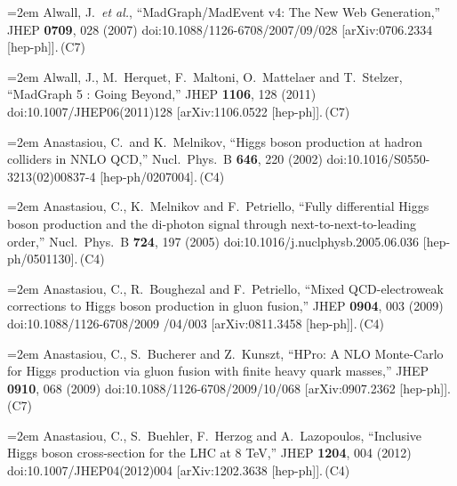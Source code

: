 \documentclass[letter,12pt]{article}
\def\xbibitem#1#2#3{\noindent\hangindent=2em #2\,(#3)}
\begin{document}
\xbibitem{Alwall:2007st}{Alwall, J.\ {\it et al.},
  ``MadGraph/MadEvent v4: The New Web Generation,''
  JHEP {\bf 0709}, 028 (2007)
  doi:10.1088/1126-6708/2007/09/028
  [arXiv:0706.2334 [hep-ph]].}{C7}
  
\xbibitem{Alwall:2011uj}{Alwall, J., M.~Herquet, F.~Maltoni, O.~Mattelaer and T.~Stelzer,
  ``MadGraph 5 : Going Beyond,''
  JHEP {\bf 1106}, 128 (2011)
  doi:10.1007/JHEP06(2011)128
  [arXiv:1106.0522 [hep-ph]].}{C7} 
  
\xbibitem{Anastasiou:2002yz}{Anastasiou, C.\ and K.~Melnikov,
  ``Higgs boson production at hadron colliders in NNLO QCD,''
  Nucl.\ Phys.\ B {\bf 646}, 220 (2002)
  doi:10.1016/S0550-3213(02)00837-4
  [hep-ph/0207004].}{C4}

\xbibitem{Anastasiou:2005qj}{Anastasiou, C., K.~Melnikov and F.~Petriello,
  ``Fully differential Higgs boson production and the di-photon signal through next-to-next-to-leading order,''
  Nucl.\ Phys.\ B {\bf 724}, 197 (2005)
  doi:10.1016/j.nuclphysb.2005.06.036
  [hep-ph/0501130].}{C4}
  
\xbibitem{Anastasiou:2008tj} {Anastasiou, C., R.~Boughezal and F.~Petriello,
  ``Mixed QCD-electroweak corrections to Higgs boson production in gluon fusion,''
  JHEP {\bf 0904}, 003 (2009)
  doi:10.1088/1126-6708/2009 /04/003
  [arXiv:0811.3458 [hep-ph]].}{C4}

\xbibitem{Anastasiou:2009kn}{Anastasiou, C., S.~Bucherer and Z.~Kunszt,
  ``HPro: A NLO Monte-Carlo for Higgs production via gluon fusion with finite heavy quark masses,''
  JHEP {\bf 0910}, 068 (2009)
  doi:10.1088/1126-6708/2009/10/068
  [arXiv:0907.2362 [hep-ph]].}{C7}
  
\xbibitem{Anastasiou:2012hx}{Anastasiou, C., S.~Buehler, F.~Herzog and A.~Lazopoulos,
  ``Inclusive Higgs boson cross-section for the LHC at 8 TeV,''
  JHEP {\bf 1204}, 004 (2012)
  doi:10.1007/JHEP04(2012)004
  [arXiv:1202.3638 [hep-ph]].}{C4}
\end{document}
